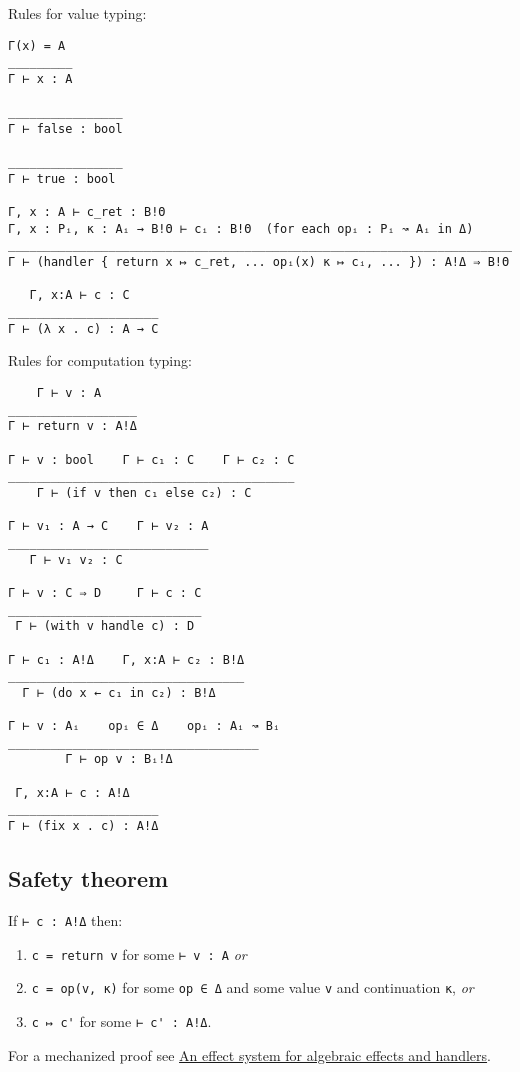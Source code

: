 \documentclass{article}
\begin{document}
Rules for value typing:
%
\begin{lstlisting}
Γ(x) = A
_________
Γ ⊢ x : A

________________
Γ ⊢ false : bool

________________
Γ ⊢ true : bool

Γ, x : A ⊢ c_ret : B!Θ
Γ, x : Pᵢ, κ : Aᵢ → B!Θ ⊢ cᵢ : B!Θ  (for each opᵢ : Pᵢ ↝ Aᵢ in Δ)
_______________________________________________________________________
Γ ⊢ (handler { return x ↦ c_ret, ... opᵢ(x) κ ↦ cᵢ, ... }) : A!Δ ⇒ B!Θ

   Γ, x:A ⊢ c : C
_____________________
Γ ⊢ (λ x . c) : A → C
\end{lstlisting}
%
Rules for computation typing:
%
\begin{lstlisting}
    Γ ⊢ v : A
__________________
Γ ⊢ return v : A!Δ

Γ ⊢ v : bool    Γ ⊢ c₁ : C    Γ ⊢ c₂ : C
________________________________________
    Γ ⊢ (if v then c₁ else c₂) : C

Γ ⊢ v₁ : A → C    Γ ⊢ v₂ : A
____________________________
   Γ ⊢ v₁ v₂ : C

Γ ⊢ v : C ⇒ D     Γ ⊢ c : C
___________________________
 Γ ⊢ (with v handle c) : D

Γ ⊢ c₁ : A!Δ    Γ, x:A ⊢ c₂ : B!Δ
_________________________________
  Γ ⊢ (do x ← c₁ in c₂) : B!Δ

Γ ⊢ v : Aᵢ    opᵢ ∈ Δ    opᵢ : Aᵢ ↝ Bᵢ
___________________________________
        Γ ⊢ op v : Bᵢ!Δ

 Γ, x:A ⊢ c : A!Δ
_____________________
Γ ⊢ (fix x . c) : A!Δ
\end{lstlisting}

\subsection{Safety theorem}

If \lstinline{⊢ c : A!Δ} then:
%
\begin{enumerate}
\item \lstinline{c = return v} for some \lstinline{⊢ v : A} \emph{or}
\item \lstinline{c = op(v, κ)} for some \lstinline{op ∈ Δ} and some value \lstinline{v} and continuation \lstinline{κ}, \emph{or}
\item \lstinline{c ↦ c'} for some \lstinline{⊢ c' : A!Δ}.
\end{enumerate}
%
For a mechanized proof see \href{https://arxiv.org/abs/1306.6316}{An effect
  system for algebraic effects and handlers}.
\end{document}
